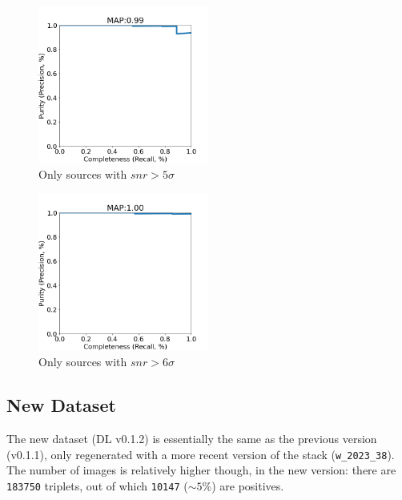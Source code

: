 \documentclass[DM,authoryear,toc]{lsstdoc}
\begin{document}
\begin{figure}[h]
  \centering
  \includegraphics[width=0.5\textwidth]{precrec___checkpoint_epoch0000087_0200000____rbdata_data_npy_data_gt1M-5sigma___posw_30.png}
  \caption{Only sources with $snr > 5\sigma$}
  \label{fig:tract_templates}
\end{figure}

\begin{figure}[h]
  \centering
  \includegraphics[width=0.5\textwidth]{precrec___checkpoint_epoch0000087_0200000____rbdata_data_npy_data_gt1M-6sigma___posw_30.png}
  \caption{Only sources with $snr > 6\sigma$}
  \label{fig:tract_templates}
\end{figure}

\clearpage
\subsection{New Dataset}
\label{sec:new_dataset}
The new dataset (DL v0.1.2) is essentially the same as the previous version (v0.1.1), only regenerated with a more recent version of the stack (\texttt{w\_2023\_38}). The number of images is relatively higher though, in the new version: there are \texttt{183750} triplets, out of which \texttt{10147} ($\sim 5\%$) are positives.
\end{document}
